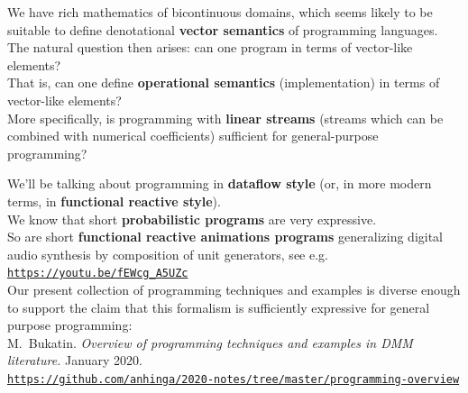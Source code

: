\documentclass{beamer}
\begin{document}
\begin{frame}
   We have rich mathematics of bicontinuous domains, which seems likely to be suitable to define denotational 
   {\bf vector semantics}
   of programming languages.\\[2ex]

   The natural question then arises: can one program in terms of vector-like elements?\\[2ex]

   That is, can one define {\bf operational semantics} (implementation) in terms of vector-like elements?\\[2ex]

   More specifically, is programming with {\bf linear streams} (streams which can be
   combined with numerical coefficients) sufficient for general-purpose programming?
\end{frame}

\begin{frame}
   We'll be talking about programming in {\bf dataflow style} (or, in more modern terms, in
   {\bf functional reactive style}).\\[2ex]

   We know that short {\bf probabilistic programs} are very expressive.\\[2ex]

   So are short {\bf functional reactive animations programs} generalizing digital audio
   synthesis by composition of unit generators, see e.g.
   \href{https://youtu.be/fEWcg\_A5UZc}{\tt https://youtu.be/fEWcg\_A5UZc}\\[2ex]

   Our present collection of programming techniques and examples is diverse enough to support the claim that
this formalism is sufficiently expressive for general purpose programming:\\[1ex]
   M.~Bukatin.
{\em Overview of programming techniques and examples in DMM literature.} January 2020.\\
\href{https://github.com/anhinga/2020-notes/tree/master/programming-overview}
{\tt\scriptsize https://github.com/anhinga/2020-notes/tree/master/programming-overview}
\end{frame}
\end{document}
